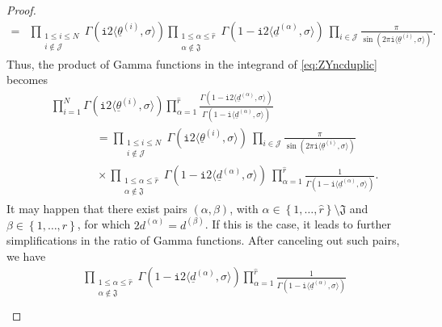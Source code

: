 \documentclass[12pt,a4paper,oneside]{amsart}
\numberwithin{equation}{section}
\theoremstyle{definition}
\theoremstyle{remark}
\newcommand{\ii}{\mathtt{i}}
\begin{document}
\begin{proof}
\begin{align*}
	= &\prod_{\substack{ 1 \le i \le N \\ i \notin \mathcal{J} }} \Gamma \left( \ii 2 \langle \underline{\theta}^{(i)}, \sigma \rangle \right)\prod_{\substack{ 1 \le \alpha \le \hat{r} \\ \alpha \notin \mathfrak{J}} } \Gamma \left( 1 - \ii 2 \langle\underline{d}^{(\alpha)}, \sigma \rangle \right) ~ \prod_{i \in \mathcal{J} } \frac{\pi}{\sin \left( 2 \pi \ii \langle \underline{\theta}^{(i)}, \sigma \rangle\right)} .
\end{align*}
Thus, the product of Gamma functions in the integrand of \eqref{eq:ZYncduplic} becomes 
\begin{equation*}
\begin{aligned}
    & \prod_{i=1}^{N} \Gamma \left( \ii 2 \langle \underline{\theta}^{(i)}, \sigma \rangle \right) \prod_{\alpha=1}^{\hat{r}} \frac{\Gamma \left( 1 - \ii 2 \langle\underline{d}^{(\alpha)}, \sigma \rangle \right) }{\Gamma \left( 1 - \ii \langle\underline{d}^{(\alpha)}, \sigma \rangle \right)}  \\
    & \qquad \qquad = \prod_{\substack{ 1 \le i \le N \\ i \notin \mathcal{J} }} \Gamma \left( \ii 2 \langle \underline{\theta}^{(i)}, \sigma \rangle \right) ~ \prod_{i \in \mathcal{J} } \frac{\pi}{\sin \left( 2 \pi \ii \langle \underline{\theta}^{(i)}, \sigma \rangle\right)} \\
    & \qquad \qquad \times \prod_{\substack{ 1 \le \alpha \le \hat{r} \\ \alpha \notin \mathfrak{J}} } \Gamma \left( 1 - \ii 2 \langle\underline{d}^{(\alpha)}, \sigma \rangle \right) ~ \prod_{\alpha=1}^{\hat{r}} \frac{1}{\Gamma \left( 1 - \ii \langle\underline{d}^{(\alpha)}, \sigma \rangle \right)} .
\end{aligned}
\end{equation*}
It may happen that there exist pairs $(\alpha, \beta)$, with $\alpha \in \left\{1, \dots, \hat{r} \right\}\setminus \mathfrak{J}$ and $\beta \in \left\{1, \dots, \hat{r} \right\}$, for which $2d^{(\alpha)}=d^{(\beta)}$. If this is the case, it leads to further simplifications in the ratio of Gamma functions. After canceling out such pairs, we have 
\begin{equation*}
\begin{aligned}
	&\prod_{\substack{ 1 \le \alpha \le \hat{r} \\ \alpha \notin \mathfrak{J}}} \Gamma \left( 1 - \ii 2 \langle\underline{d}^{(\alpha)}, \sigma \rangle \right) \prod_{\alpha=1}^{\hat{r}}\frac{1}{\Gamma \left( 1 - \ii \langle\underline{d}^{(\alpha)}, \sigma \rangle \right)} \\

\end{aligned}
\end{equation*}
\end{proof}
\end{document}
